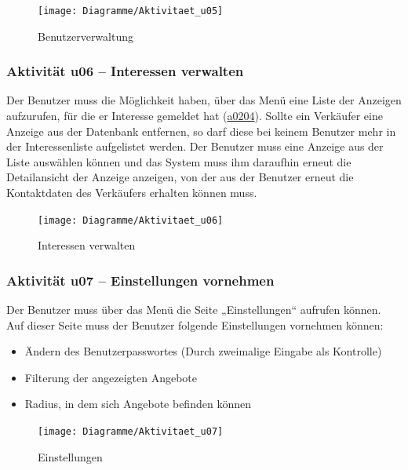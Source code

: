\documentclass[a4paper,12pt,oneside]{scrartcl}
\begin{document}
\begin{figure}[!htbp]
\centering
\noindent\texttt{[image: Diagramme/Aktivitaet\_u05]}
\caption{Benutzerverwaltung}
\end{figure}
\FloatBarrier


\subsubsection{Aktivität u06 – Interessen verwalten}
Der Benutzer muss die Möglichkeit haben, über das Menü eine Liste der Anzeigen aufzurufen, für die er Interesse gemeldet hat (\hyperlink{u02}{a0204}).
Sollte ein Verkäufer eine Anzeige aus der Datenbank entfernen, so darf diese bei keinem Benutzer mehr in der Interessenliste aufgelistet werden.
Der Benutzer muss eine Anzeige aus der Liste auswählen können und das System muss ihm daraufhin erneut die Detailansicht der Anzeige anzeigen, von der aus der Benutzer erneut die Kontaktdaten des Verkäufers erhalten können muss.

\begin{figure}[!htbp]
\centering
\noindent\texttt{[image: Diagramme/Aktivitaet\_u06]}
\caption{Interessen verwalten}
\end{figure}
\FloatBarrier


\subsubsection{Aktivität u07 – Einstellungen vornehmen}
Der Benutzer muss über das Menü die Seite „Einstellungen“ aufrufen können.
Auf dieser Seite muss der Benutzer folgende Einstellungen vornehmen können:
\begin{itemize}
	\item Ändern des Benutzerpasswortes (Durch zweimalige Eingabe als Kontrolle)
	\item Filterung der angezeigten Angebote
	\item Radius, in dem sich Angebote befinden können
\end{itemize}

\begin{figure}[!htbp]
\centering
\noindent\texttt{[image: Diagramme/Aktivitaet\_u07]}
\caption{Einstellungen}
\end{figure}
\FloatBarrier
\end{document}
